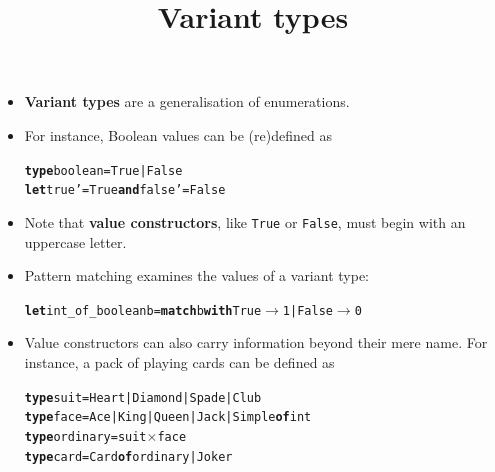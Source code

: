 \documentclass[wide]{slides}
\begin{document}
\begin{slide}
  \title{Variant types}

  \begin{itemize}

    \item \textbf{Variant types} are a generalisation of
      enumerations.

    \item For instance, Boolean values can be (re)defined as
\begin{alltt}
\textbf{type} boolean = True | False
\textbf{let} true' = True \textbf{and} false' = False
\end{alltt}

    \item Note that \textbf{value constructors}, like \texttt{True} or
      \texttt{False}, must begin with an uppercase letter.

    \item Pattern matching examines the values of a variant type:
\begin{alltt}
\textbf{let} int\_of\_boolean b = \textbf{match} b \textbf{with} True  \(\rightarrow\) 1 | False \(\rightarrow\) 0
\end{alltt}

    \item Value constructors can also carry information beyond their
      mere name. For instance, a pack of playing cards can be defined
      as
\begin{alltt}
\textbf{type} suit = Heart | Diamond | Spade | Club
\textbf{type} face = Ace | King | Queen | Jack | Simple \textbf{of} int
\textbf{type} ordinary = suit \(\times\) face
\textbf{type} card = Card \textbf{of} ordinary | Joker
\end{alltt}

  \end{itemize}

\end{slide}
\end{document}
